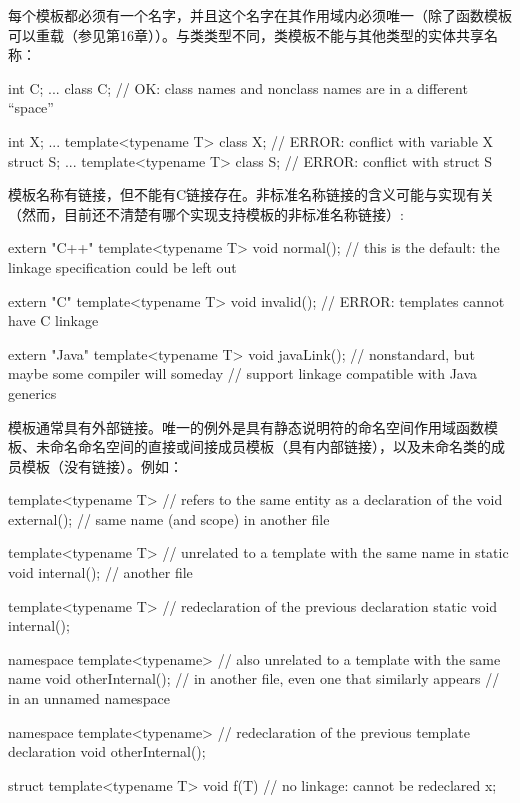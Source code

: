 每个模板都必须有一个名字，并且这个名字在其作用域内必须唯一（除了函数模板可以重载（参见第16章））。与类类型不同，类模板不能与其他类型的实体共享名称：

\begin{cpp}
int C;
...
class C; // OK: class names and nonclass names are in a different “space”

int X;
...
template<typename T>
class X; // ERROR: conflict with variable X
struct S;
...
template<typename T>
class S; // ERROR: conflict with struct S
\end{cpp}

模板名称有链接，但不能有C链接存在。非标准名称链接的含义可能与实现有关（然而，目前还不清楚有哪个实现支持模板的非标准名称链接）:

\begin{cpp}
extern "C++" template<typename T>
void normal(); // this is the default: the linkage specification could be left out

extern "C" template<typename T>
void invalid(); // ERROR: templates cannot have C linkage

extern "Java" template<typename T>
void javaLink(); // nonstandard, but maybe some compiler will someday
				// support linkage compatible with Java generics
\end{cpp}

模板通常具有外部链接。唯一的例外是具有静态说明符的命名空间作用域函数模板、未命名命名空间的直接或间接成员模板（具有内部链接），以及未命名类的成员模板（没有链接）。例如：

\begin{cpp}
template<typename T> // refers to the same entity as a declaration of the
void external(); // same name (and scope) in another file

template<typename T> // unrelated to a template with the same name in
static void internal(); // another file

template<typename T> // redeclaration of the previous declaration
static void internal();

namespace {
	template<typename> // also unrelated to a template with the same name
	void otherInternal(); // in another file, even one that similarly appears
} // in an unnamed namespace

namespace {
	template<typename> // redeclaration of the previous template declaration
	void otherInternal();
}

struct {
	template<typename T> void f(T) {} // no linkage: cannot be redeclared
} x;
\end{cpp}

